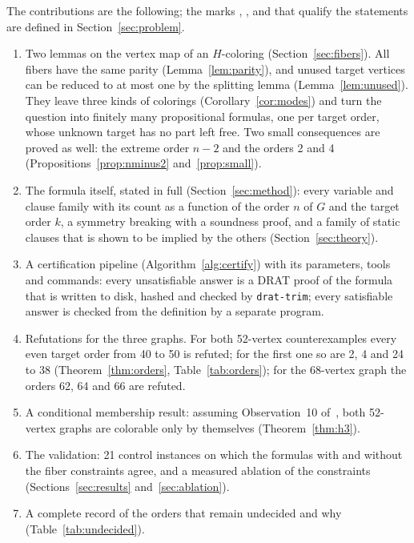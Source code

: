 The contributions are the following; the marks \evD, \evMV, \evV{} and \evU{} that qualify the
statements are defined in Section~\ref{sec:problem}.
\begin{enumerate}
\item Two lemmas on the vertex map of an $H$-coloring (Section~\ref{sec:fibers}). All fibers have the same
parity (Lemma~\ref{lem:parity}), and unused target vertices can be reduced to at most one by the splitting
lemma (Lemma~\ref{lem:unused}). They leave three kinds of colorings (Corollary~\ref{cor:modes}) and turn
the question into finitely many propositional formulas, one per target order, whose unknown target has
no part left free. Two small consequences are proved as well: the extreme order $n-2$ and the orders 2
and 4 (Propositions~\ref{prop:nminus2} and~\ref{prop:small}).
\item The formula itself, stated in full (Section~\ref{sec:method}): every variable and clause family with its
count as a function of the order $n$ of $G$ and the target order $k$, a symmetry breaking with a soundness
proof, and a family of static clauses that is shown to be implied by the others
(Section~\ref{sec:theory}).
\item A certification pipeline (Algorithm~\ref{alg:certify}) with its parameters, tools and commands: every
unsatisfiable answer is a DRAT proof of the formula that is written to disk, hashed and checked by
\texttt{drat-trim}; every satisfiable answer is checked from the definition by a separate program.
\item Refutations for the three graphs. For both 52-vertex counterexamples every even target order from 40
to 50 is refuted; for the first one so are 2, 4 and 24 to 38 (Theorem~\ref{thm:orders},
Table~\ref{tab:orders}); for the 68-vertex graph the orders 62, 64 and 66 are refuted.
\item A conditional membership result: assuming Observation~10 of~\cite{GJMMMU2026}, both 52-vertex
graphs are colorable only by themselves (Theorem~\ref{thm:h3}).
\item The validation: 21 control instances on which the formulas with and without the fiber constraints
agree, and a measured ablation of the constraints (Sections~\ref{sec:results} and~\ref{sec:ablation}).
\item A complete record of the orders that remain undecided and why (Table~\ref{tab:undecided}).
\end{enumerate}

